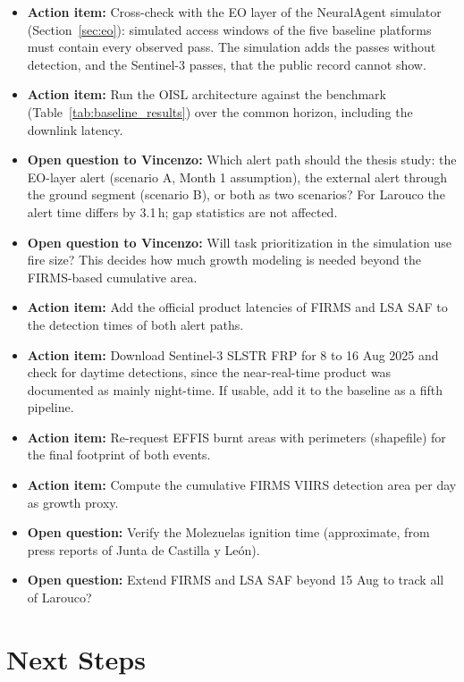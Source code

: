 \documentclass[11pt]{article}
\newcommand{\openquestion}[1]{\textcolor{openq}{\textbf{Open question:}} #1}
\newcommand{\vincenzoq}[1]{\textcolor{vincenzoq}{\textbf{Open question to Vincenzo:}} #1}
\newcommand{\actionitem}[1]{\textcolor{todo}{\textbf{Action item:}} #1}
\begin{document}
\begin{itemize}
  \item \actionitem{Cross-check with the EO layer of the NeuralAgent simulator (Section~\ref{sec:eo}): simulated access windows of the five baseline platforms must contain every observed pass. The simulation adds the passes without detection, and the Sentinel-3 passes, that the public record cannot show.}
  \item \actionitem{Run the OISL architecture against the benchmark (Table~\ref{tab:baseline_results}) over the common horizon, including the downlink latency.}
  \item \vincenzoq{Which alert path should the thesis study: the EO-layer alert (scenario A, Month 1 assumption), the external alert through the ground segment (scenario B), or both as two scenarios? For Larouco the alert time differs by 3.1\,h; gap statistics are not affected.}
  \item \vincenzoq{Will task prioritization in the simulation use fire size? This decides how much growth modeling is needed beyond the FIRMS-based cumulative area.}
  \item \actionitem{Add the official product latencies of FIRMS and LSA SAF to the detection times of both alert paths.}
  \item \actionitem{Download Sentinel-3 SLSTR FRP for 8 to 16 Aug 2025 and check for daytime detections, since the near-real-time product was documented as mainly night-time. If usable, add it to the baseline as a fifth pipeline.}
  \item \actionitem{Re-request EFFIS burnt areas with perimeters (shapefile) for the final footprint of both events.}
  \item \actionitem{Compute the cumulative FIRMS VIIRS detection area per day as growth proxy.}
  \item \openquestion{Verify the Molezuelas ignition time (approximate, from press reports of Junta de Castilla y Le\'on).}
  \item \openquestion{Extend FIRMS and LSA SAF beyond 15 Aug to track all of Larouco?}
\end{itemize}

\section{Next Steps}
\end{document}

